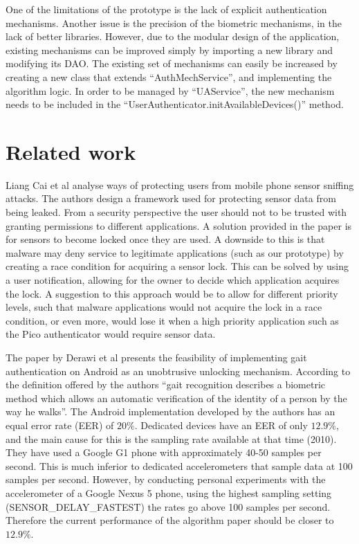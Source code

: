 
One of the limitations of the prototype is the lack of explicit authentication mechanisms. Another issue is the precision of the biometric mechanisms, in the lack of better libraries. However, due to the modular design of the application, existing mechanisms can be improved simply by importing a new library and modifying its DAO. The existing set of mechanisms can easily be increased by creating a new class that extends ``AuthMechService'', and implementing the algorithm logic. In order to be managed by ``UAService'', the new mechanism needs to be included in the ``UserAuthenticator.initAvailableDevices()'' method.

\section{Related work}
Liang Cai et al \cite{cai2009defending} analyse ways of protecting users from mobile phone sensor sniffing attacks. The authors design a framework used for protecting sensor data from being leaked. From a security perspective the user should not to be trusted with granting permissions to different applications. A solution provided in the paper is for sensors to become locked once they are used. A downside to this is that malware may deny service to legitimate applications (such as our prototype) by creating a race condition for acquiring a sensor lock. This can be solved by using a user notification, allowing for the owner to decide which application acquires the lock. A suggestion to this approach would be to allow for different priority levels, such that malware applications would not acquire the lock in a race condition, or even more, would lose it when a high priority application such as the Pico authenticator would require sensor data.

The paper by Derawi et al \cite{derawi2010unobtrusive} presents the feasibility of implementing gait authentication on Android as an unobtrusive unlocking mechanism. According to the definition offered by the authors ``gait recognition describes a biometric method which allows an automatic verification of the identity of a person by the way he walks''. The Android implementation developed by the authors has an equal error rate (EER) of $20\%$. Dedicated devices have an EER of only $12.9\%$, and the main cause for this is the sampling rate available at that time (2010). They have used a Google G1 phone with approximately 40-50 samples per second. This is much inferior to dedicated accelerometers that sample data at 100 samples per second. However, by conducting personal experiments with the accelerometer of a Google Nexus 5 phone, using the highest sampling setting (SENSOR\_DELAY\_FASTEST) the rates go above 100 samples per second. Therefore the current performance of the algorithm paper should be closer to $12.9\%$.

